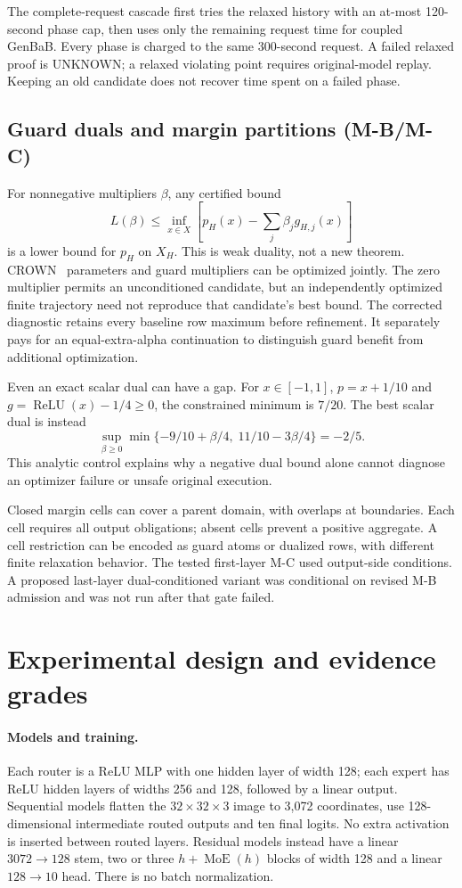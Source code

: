 \documentclass[11pt]{article}
\begin{document}
The complete-request cascade first tries the relaxed history with an at-most
120-second phase cap, then uses only the remaining request time for coupled
GenBaB. Every phase is charged to the same 300-second request. A failed relaxed
proof is UNKNOWN; a relaxed violating point requires original-model replay.
Keeping an old candidate does not recover time spent on a failed phase.

\subsection{Guard duals and margin partitions (M-B/M-C)}
For nonnegative multipliers $\beta$, any certified bound
\[
 L(\beta)\leq\inf_{x\in X}
       \left[p_H(x)-\sum_j\beta_jg_{H,j}(x)\right]
\]
is a lower bound for $p_H$ on $X_H$. This is weak duality, not a new theorem.
CROWN~\cite{crown} parameters and guard multipliers can be optimized jointly.
The zero multiplier permits an unconditioned candidate, but an independently
optimized finite trajectory need not reproduce that candidate's best bound.
The corrected diagnostic retains every baseline row maximum before refinement.
It separately pays for an equal-extra-alpha continuation to distinguish guard
benefit from additional optimization.

Even an exact scalar dual can have a gap. For $x\in[-1,1]$,
$p=x+1/10$ and $g=\operatorname{ReLU}(x)-1/4\geq0$, the constrained minimum
is $7/20$. The best scalar dual is instead
\[
 \sup_{\beta\geq0}\min\{-9/10+\beta/4,\;11/10-3\beta/4\}=-2/5.
\]
This analytic control explains why a negative dual bound alone cannot diagnose
an optimizer failure or unsafe original execution.

Closed margin cells can cover a parent domain, with overlaps at boundaries.
Each cell requires all output obligations; absent cells prevent a positive
aggregate. A cell restriction can be encoded as guard atoms or dualized rows,
with different finite relaxation behavior. The tested first-layer M-C used
output-side conditions. A proposed last-layer dual-conditioned variant was
conditional on revised M-B admission and was not run after that gate failed.

\section{Experimental design and evidence grades}
\paragraph{Models and training.}
Each router is a ReLU MLP with one hidden layer of width 128; each expert has
ReLU hidden layers of widths 256 and 128, followed by a linear output.
Sequential models flatten the $32\times32\times3$ image to 3,072 coordinates,
use 128-dimensional intermediate routed outputs and ten final logits. No
extra activation is inserted between routed layers. Residual models instead
have a linear $3072\to128$ stem, two or three $h+\operatorname{MoE}(h)$ blocks
of width 128 and a linear $128\to10$ head. There is no batch normalization.
\end{document}
